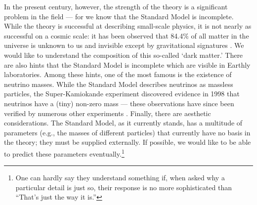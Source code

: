 \documentclass[12pt,twoside,class=../reedthesis, crop=false]{standalone}
\begin{document}
	In the present century, however, the strength of the theory is a significant problem in the field --- for we know that the Standard Model is incomplete. While the theory is successful at describing small-scale physics, it is not nearly as successful on a cosmic scale: it has been observed that 84.4\% of all matter in the universe is unknown to us and invisible except by gravitational signatures \cite{particle_data_group_review_2020}. We would like to understand the composition of this so-called `dark matter.' There are also hints that the Standard Model is incomplete which are visible in Earthly laboratories. Among these hints, one of the most famous is the existence of neutrino masses. While the Standard Model describes neutrinos as massless particles, the Super-Kamiokande experiment discovered evidence in 1998 that neutrinos have a (tiny) non-zero mass \cite{super-kamiokande_collaboration_evidence_1998} --- these observations have since been verified by numerous other experiments \cite{particle_data_group_review_2020}. Finally, there are aesthetic considerations. The Standard Model, as it currently stands, has a multitude of parameters (e.g., the masses of different particles) that currently have no basis in the theory; they must be supplied externally. If possible, we would like to be able to predict these parameters eventually.\footnote{One can hardly say they understand something if, when asked why a particular detail is just so, their response is no more sophisticated than ``That's just the way it is.''}
\end{document}

